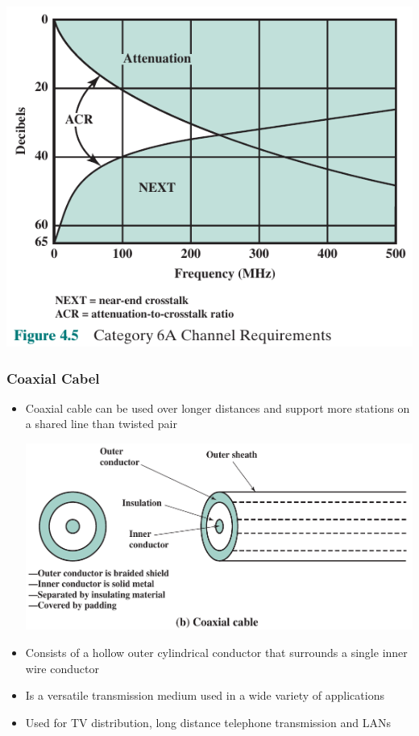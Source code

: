 \documentclass[pdflatex,compress]{beamer}
\begin{document}
\begin{frame}
	\begin{center}
		\includegraphics[width=0.7\linewidth]{img/img10}
	\end{center}
\end{frame}

\begin{frame}
	\frametitle{Coaxial Cabel}
	\begin{itemize}
		\item Coaxial cable can be used over longer distances and support more stations on a shared line than twisted pair
		\begin{center}
			\includegraphics[width=0.5\linewidth]{img/img04}
		\end{center}
		\item Consists of a hollow outer cylindrical conductor that surrounds a single inner wire conductor
		\item Is a versatile transmission medium used in a wide variety of applications
		\item Used for TV distribution, long distance telephone transmission and LANs
	\end{itemize}
\end{frame}
\end{document}
